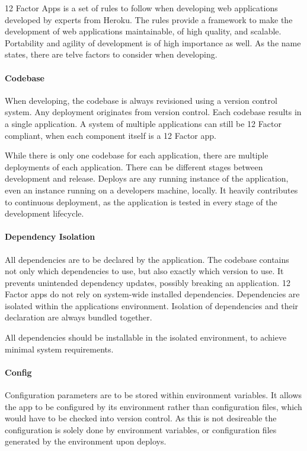 12 Factor Apps is a set of rules to follow when developing web applications
developed by experts from Heroku. The rules provide a framework to make the
development of web applications maintainable, of high quality, and scalable.
Portability and agility of development is of high importance as well. As the
name states, there are telve factors to consider when developing.

\paragraph{Codebase}

When developing, the codebase is always revisioned using a version control
system. Any deployment originates from version control. Each codebase results
in a single application. A system of multiple applications can still be 12
Factor compliant, when each component itself is a 12 Factor app.

While there is only one codebase for each application, there are multiple
deployments of each application. There can be different stages between
development and release. Deploys are any running instance of the application,
even an instance running on a developers machine, locally. It heavily
contributes to continuous deployment, as the application is tested in every
stage of the development lifecycle.

\paragraph{Dependency Isolation}

All dependencies are to be declared by the application. The codebase contains
not only which dependencies to use, but also exactly which version to use. It
prevents unintended dependency updates, possibly breaking an application. 12
Factor apps do not rely on system-wide installed dependencies. Dependencies are
isolated within the applications environment. Isolation of dependencies and
their declaration are always bundled together.

All dependencies should be installable in the isolated environment, to achieve
minimal system requirements.

\paragraph{Config}
\label{para:12factor:config}

Configuration parameters are to be stored within environment variables. It
allows the app to be configured by its environment rather than configuration
files, which would have to be checked into version control. As this is not
desireable the configuration is solely done by environment variables, or
configuration files generated by the environment upon deploys.

